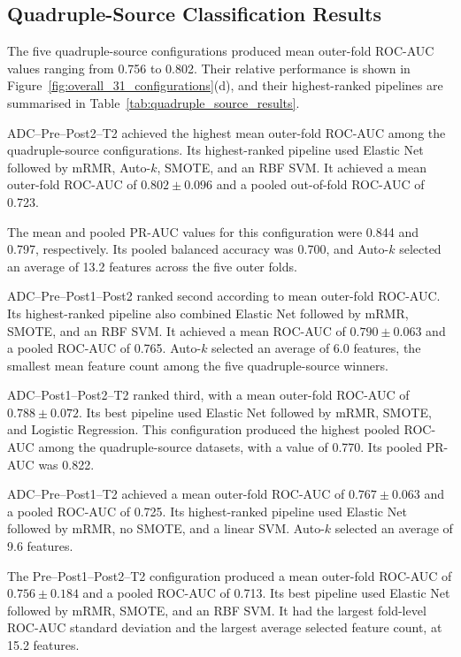 \documentclass[12pt,twocolumn]{article}
\begin{document}
\subsection{Quadruple-Source Classification Results}
\label{subsec:quadruple_source_results}

The five quadruple-source configurations produced mean outer-fold
ROC-AUC values ranging from 0.756 to 0.802. Their relative
performance is shown in
Figure~\ref{fig:overall_31_configurations}(d), and their
highest-ranked pipelines are summarised in
Table~\ref{tab:quadruple_source_results}.

ADC--Pre--Post2--T2 achieved the highest mean outer-fold ROC-AUC
among the quadruple-source configurations. Its highest-ranked
pipeline used Elastic Net followed by mRMR, Auto-\(k\), SMOTE, and
an RBF SVM. It achieved a mean outer-fold ROC-AUC of
\(0.802 \pm 0.096\) and a pooled out-of-fold ROC-AUC of 0.723.

The mean and pooled PR-AUC values for this configuration were 0.844
and 0.797, respectively. Its pooled balanced accuracy was 0.700,
and Auto-\(k\) selected an average of 13.2 features across the five
outer folds.

ADC--Pre--Post1--Post2 ranked second according to mean outer-fold
ROC-AUC. Its highest-ranked pipeline also combined Elastic Net
followed by mRMR, SMOTE, and an RBF SVM. It achieved a mean
ROC-AUC of \(0.790 \pm 0.063\) and a pooled ROC-AUC of 0.765.
Auto-\(k\) selected an average of 6.0 features, the smallest mean
feature count among the five quadruple-source winners.

ADC--Post1--Post2--T2 ranked third, with a mean outer-fold
ROC-AUC of \(0.788 \pm 0.072\). Its best pipeline used Elastic Net
followed by mRMR, SMOTE, and Logistic Regression. This
configuration produced the highest pooled ROC-AUC among the
quadruple-source datasets, with a value of 0.770. Its pooled PR-AUC
was 0.822.

ADC--Pre--Post1--T2 achieved a mean outer-fold ROC-AUC of
\(0.767 \pm 0.063\) and a pooled ROC-AUC of 0.725. Its
highest-ranked pipeline used Elastic Net followed by mRMR, no SMOTE,
and a linear SVM. Auto-\(k\) selected an average of 9.6 features.

The Pre--Post1--Post2--T2 configuration produced a mean outer-fold
ROC-AUC of \(0.756 \pm 0.184\) and a pooled ROC-AUC of 0.713.
Its best pipeline used Elastic Net followed by mRMR, SMOTE, and an
RBF SVM. It had the largest fold-level ROC-AUC standard deviation
and the largest average selected feature count, at 15.2 features.
\end{document}
